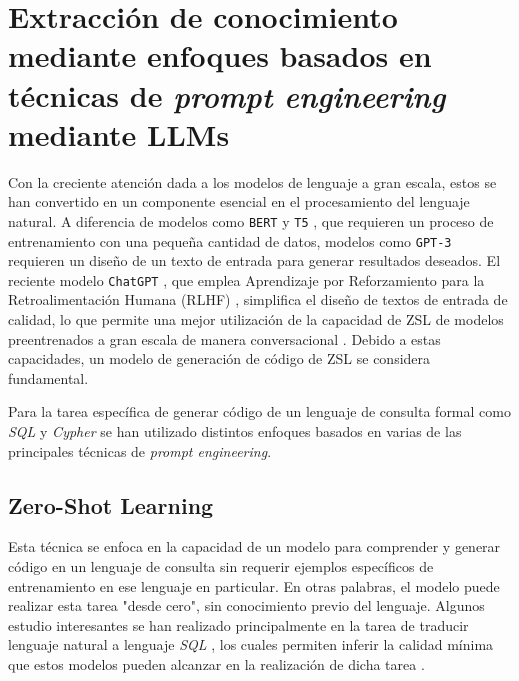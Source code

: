 \section{Extracción de conocimiento mediante enfoques basados en técnicas de \textit{prompt engineering} mediante LLMs} \label{llm_approach}

Con la creciente atención dada a los modelos de lenguaje a gran escala, estos se han convertido en un componente esencial en el procesamiento del lenguaje natural. A diferencia de modelos como \texttt{BERT} \cite{bert} y \texttt{T5} \cite{t5}, que requieren un proceso de entrenamiento con una pequeña cantidad de datos, modelos como \texttt{GPT-3} \cite{gpt3} requieren un diseño de un texto de entrada para generar resultados deseados. El reciente modelo \texttt{ChatGPT} \cite{chatgpt}, que emplea Aprendizaje por Reforzamiento para la Retroalimentación Humana (RLHF) \cite{Pangeanic2023Aprendizaje}, simplifica el diseño de textos de entrada de calidad, lo que permite una mejor utilización de la capacidad de ZSL de modelos preentrenados a gran escala de manera conversacional \cite{llmsoverview}. Debido a estas capacidades, un modelo de generación de código de ZSL se considera fundamental.

Para la tarea específica de generar código de un lenguaje de consulta formal como \textit{SQL} y \textit{Cypher} se han utilizado distintos enfoques basados en varias de las principales técnicas de \textit{prompt engineering}.

\subsection{Zero-Shot Learning} \label{llm_approach_zsl}
	Esta técnica se enfoca en la capacidad de un modelo para comprender y generar código en un lenguaje de consulta sin requerir ejemplos específicos de entrenamiento en ese lenguaje en particular. En otras palabras, el modelo puede realizar esta tarea "desde cero", sin conocimiento previo del lenguaje. Algunos estudio interesantes se han realizado principalmente en la tarea de traducir lenguaje natural a lenguaje \textit{SQL} \cite{text2sqlzsl1} \cite{text2sqlzsl2}, los cuales permiten inferir la calidad mínima que estos modelos pueden alcanzar en la realización de dicha tarea \cite{llmsoverview}.

